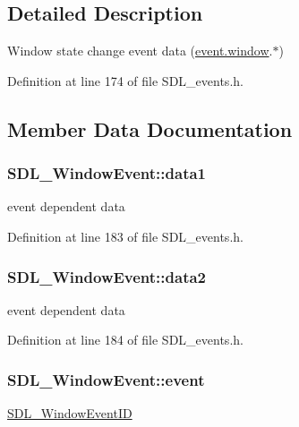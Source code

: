 \subsection{Detailed Description}
Window state change event data (\hyperlink{union_s_d_l___event_a826936b3275406d857bc6654669fae71}{event.\-window}.$\ast$) 

Definition at line 174 of file S\-D\-L\-\_\-events.\-h.



\subsection{Member Data Documentation}
\hypertarget{struct_s_d_l___window_event_a01da0025428d3434c80021f3e4089fec}{
\subsubsection[{data1}]{ S\-D\-L\-\_\-\-Window\-Event\-::data1}}\label{struct_s_d_l___window_event_a01da0025428d3434c80021f3e4089fec}
event dependent data 

Definition at line 183 of file S\-D\-L\-\_\-events.\-h.

\hypertarget{struct_s_d_l___window_event_af6cd0a21bc9ecadfee42f6a0147d7171}{
\subsubsection[{data2}]{ S\-D\-L\-\_\-\-Window\-Event\-::data2}}\label{struct_s_d_l___window_event_af6cd0a21bc9ecadfee42f6a0147d7171}
event dependent data 

Definition at line 184 of file S\-D\-L\-\_\-events.\-h.

\hypertarget{struct_s_d_l___window_event_a485cd1f07f0f22fdb9f4c4bf214011dc}{
\subsubsection[{event}]{ S\-D\-L\-\_\-\-Window\-Event\-::event}}\label{struct_s_d_l___window_event_a485cd1f07f0f22fdb9f4c4bf214011dc}
\hyperlink{_s_d_l__video_8h_ac486b40a4860d980dbc74d0b4adf3bab}{S\-D\-L\-\_\-\-Window\-Event\-I\-D} 

